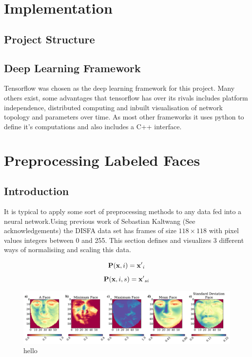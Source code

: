 \documentclass[11pt,twoside]{report}
\begin{document}
\chapter{Implementation}
\section{Project Structure}
\section{Deep Learning Framework}
Tensorflow \cite{tensorflow} was chosen as the deep learning framework for this
project. Many others exist, some advantages that tensorflow has over its rivals
includes platform independence, distributed computing and inbuilt visualisation
of network topology and parameters over time. As most other frameworks it uses python
to define it's computations and also includes a C++ interface.


\chapter{Preprocessing Labeled Faces}
\section{Introduction}
It is typical to apply some sort of preprocessing methods to any data fed into
a neural network.Using previous work of Sebastian Kaltwang (See acknowledgements) the
DISFA data set has frames of size $118 \times 118$ with pixel values integers between
0 and 255. This section defines and visualizes 3 different ways of normalisiing and scaling
this data.



\begin{equation}
  {\bf P}({\bf x},i) = {\bf x'}_i
\end{equation}
\begin{equation}
  {\bf P}({\bf x},i,s) = {\bf x'}_{si}
\end{equation}
\begin{figure}[!h]
\centering
\includegraphics[width =\hsize]{figures/faces.pdf}
\caption{hello}
\label{fig:simple}
\end{figure}
\end{document}
